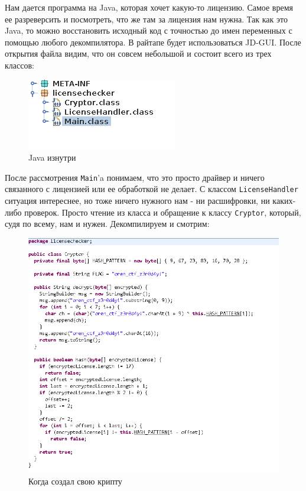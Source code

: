 \documentclass[idxtotoc,hyperref,openany,oneside]{files/reverse} %
\begin{document}
Нам дается программа на Java, которая хочет какую-то лицензию. Самое время ее разреверсить и посмотреть, что же там за лицензия нам нужна. Так как это Java, то можно восстановить исходный код с точностью до имен переменных с помощью любого декомпилятора. В райтапе будет использоваться JD-GUI. После открытия файла видим, что он совсем небольшой и состоит всего из трех классов:
\begin{figure}[H]
\begin{center}
\includegraphics[width=0.7\linewidth]{files/java-classes}
\end{center}
\caption{Java изнутри}
\label{fig:java-classes}
\end{figure}

После рассмотрения \verb|Main|'a понимаем, что это просто драйвер и ничего связанного с лицензией или ее обработкой не делает. С классом \verb|LicenseHandler| ситуация интереснее, но тоже ничего нужного нам - ни расшифровки, ни каких-либо проверок. Просто чтение из класса и обращение к классу \verb|Cryptor|, который, судя по всему, нам и нужен. Декомпилируем и смотрим:
\begin{figure}[H]
\begin{center}
\includegraphics[width=0.7\linewidth]{files/java-cryptor}
\end{center}
\caption{Когда создал свою крипту}
\label{fig:java-classes}
\end{figure}
\end{document}
